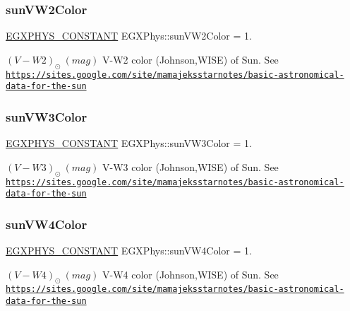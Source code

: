 \subsubsection{\texorpdfstring{sun\+V\+W2\+Color}{sunVW2Color}}
{\footnotesize\ttfamily \mbox{\hyperlink{group___e_g_x_phys-_constants-_macros_ga76980d288494ce1714c9ac68a95ba702}{E\+G\+X\+P\+H\+Y\+S\+\_\+\+C\+O\+N\+S\+T\+A\+NT}} E\+G\+X\+Phys\+::sun\+V\+W2\+Color = 1.}

$ (V-W2)_{\odot} \ (mag)$ V-\/\+W2 color (Johnson,W\+I\+SE) of Sun. See \href{https://sites.google.com/site/mamajeksstarnotes/basic-astronomical-data-for-the-sun}{\tt https\+://sites.\+google.\+com/site/mamajeksstarnotes/basic-\/astronomical-\/data-\/for-\/the-\/sun} \mbox{\label{group___e_g_x_phys-_constants-_astrophysics-_solar_system-_sun-_magnitude_ga072faaa128a56498136e62b438122d6e}} 
\subsubsection{\texorpdfstring{sun\+V\+W3\+Color}{sunVW3Color}}
{\footnotesize\ttfamily \mbox{\hyperlink{group___e_g_x_phys-_constants-_macros_ga76980d288494ce1714c9ac68a95ba702}{E\+G\+X\+P\+H\+Y\+S\+\_\+\+C\+O\+N\+S\+T\+A\+NT}} E\+G\+X\+Phys\+::sun\+V\+W3\+Color = 1.}

$ (V-W3)_{\odot} \ (mag)$ V-\/\+W3 color (Johnson,W\+I\+SE) of Sun. See \href{https://sites.google.com/site/mamajeksstarnotes/basic-astronomical-data-for-the-sun}{\tt https\+://sites.\+google.\+com/site/mamajeksstarnotes/basic-\/astronomical-\/data-\/for-\/the-\/sun} \mbox{\label{group___e_g_x_phys-_constants-_astrophysics-_solar_system-_sun-_magnitude_gab25134b4dd55e3296e4f425c9e77a187}} 
\subsubsection{\texorpdfstring{sun\+V\+W4\+Color}{sunVW4Color}}
{\footnotesize\ttfamily \mbox{\hyperlink{group___e_g_x_phys-_constants-_macros_ga76980d288494ce1714c9ac68a95ba702}{E\+G\+X\+P\+H\+Y\+S\+\_\+\+C\+O\+N\+S\+T\+A\+NT}} E\+G\+X\+Phys\+::sun\+V\+W4\+Color = 1.}

$ (V-W4)_{\odot} \ (mag)$ V-\/\+W4 color (Johnson,W\+I\+SE) of Sun. See \href{https://sites.google.com/site/mamajeksstarnotes/basic-astronomical-data-for-the-sun}{\tt https\+://sites.\+google.\+com/site/mamajeksstarnotes/basic-\/astronomical-\/data-\/for-\/the-\/sun} 